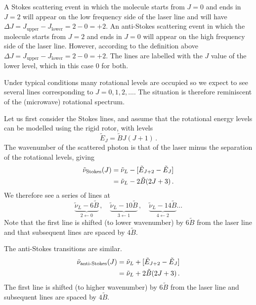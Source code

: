 \documentclass{article}
\theoremstyle{plain}\theoremheaderfont{\normalfont\itshape}\theorembodyfont{\rmfamily}\theoremseparator{.}\newtheorem*{rem}{Remark}\newtheorem*{ex}{Example}\newtheorem*{proof}{Proof}\newtheorem*{altp}{Alternative proof}
\theoremstyle{plain}\theoremheaderfont{\normalfont\bfseries}\theorembodyfont{\rmfamily}\theoremseparator{.}\newtheorem{thm}{Theorem}[section]\newtheorem{lem}[thm]{Lemma}\newtheorem{prop}[thm]{Proposition}\newtheorem*{cor}{Corollary}\newtheorem{defn}[thm]{Definition}\newtheorem{clm}[thm]{Claim}\newtheorem{clminproof}{Claim}\newtheorem{pos}{Postulate}[section]
\theoremstyle{break}\theoremheaderfont{\normalfont\itshape}\theorembodyfont{\rmfamily}\theoremseparator{.\medskip}\newtheorem*{proofskip}{Proof}\newtheorem*{exs}{Examples}\newtheorem*{rems}{Remarks}
\theoremstyle{break}\theoremheaderfont{\normalfont\bfseries}\theorembodyfont{\rmfamily}\theoremseparator{.\medskip}\newtheorem{lemskip}[thm]{Lemma}\newtheorem{defnskip}[thm]{Definition}\newtheorem{propskip}[thm]{Proposition}\newtheorem{thmskip}[thm]{Theorem}
\numberwithin{equation}{section}
\begin{document}
    A Stokes scattering event in which the molecule starts from  \(J=0\) and ends in \(J=2\) will appear on the low frequency side of the laser line and will have \(\Delta J=J_{\text{upper}}-J_{\text{lower}}=2-0=+2\). An anti-Stokes scattering event in which the molecule starts from \(J=2\) and ends in \(J=0\) will appear on the high frequency side of the laser line. However, according to the definition above \(\Delta J=J_{\text{upper}}-J_{\text{lower}}=2-0=+2\). The lines are labelled with the \(J\) value of the lower level, which in this case \(0\) for both.

    Under typical conditions many rotational levels are occupied so we expect to see several lines corresponding to \(J=0,1,2,\dots\). The situation is therefore reminiscent of the (microwave) rotational spectrum.

    Let us first consider the Stokes lines, and assume that the rotational energy levels can be modelled using the rigid rotor, with levels
    \begin{equation}
        \tilde{E}_J=\tilde{B}J(J+1)\,.
    \end{equation}
    The wavenumber of the scattered photon is that of the laser minus the separation of the rotational levels, giving
    \begin{align}
        \tilde{\nu}_{\text{Stokes}}(J)&=\tilde{\nu}_L-[\tilde{E}_{J+2}-\tilde{E}_J]\notag\\
        &=\tilde{\nu}_L-2\tilde{B}(2J+3)\,.
    \end{align}
    We therefore see a series of lines at
    \begin{equation}
        \underbrace{\tilde{\nu}_L-6\tilde{B}}_{2\leftarrow 0}\,,\quad\underbrace{\tilde{\nu}_L-10\tilde{B}}_{3\leftarrow 1}\,,\quad\underbrace{\tilde{\nu}_L-14\tilde{B}}_{4\leftarrow 2}\dots
    \end{equation}
    Note that the first line is shifted (to lower wavenumber) by \(6\tilde{B}\) from the laser line and that subsequent lines are spaced by \(4\tilde{B}\).

    The anti-Stokes transitions are similar.
    \begin{align}
        \tilde{\nu}_{\text{anti-Stokes}}(J)&=\tilde{\nu}_L+[\tilde{E}_{J+2}-\tilde{E}_J]\notag\\
        &=\tilde{\nu}_L+2\tilde{B}(2J+3)\,.
    \end{align}
    The first line is shifted (to higher wavenumber) by \(6\tilde{B}\) from the laser line and subsequent lines are spaced by \(4\tilde{B}\).
\end{document}
